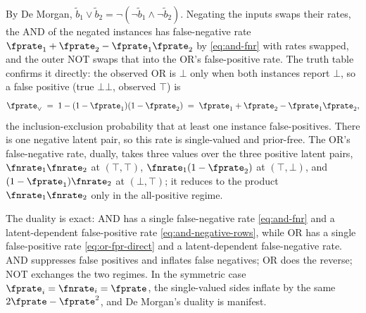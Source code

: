 By De Morgan, $\tilde{b}_1 \vee \tilde{b}_2 =
\neg(\neg \tilde{b}_1 \wedge \neg \tilde{b}_2)$. Negating the inputs swaps
their rates, the AND of the negated instances has false-negative rate $\fprate_1
+ \fprate_2 - \fprate_1 \fprate_2$ by \eqref{eq:and-fnr} with rates swapped, and
the outer NOT swaps that into the OR's false-positive rate. The truth table
confirms it directly: the observed OR is $\bot$ only when both
instances report $\bot$, so a false positive (true $\bot\bot$, observed $\top$)
is
\begin{equation}
\label{eq:or-fpr-direct}
  \fprate_\vee \;=\; 1 - (1 - \fprate_1)(1 - \fprate_2)
               \;=\; \fprate_1 + \fprate_2 - \fprate_1 \fprate_2,
\end{equation}
the inclusion-exclusion probability that at least one instance false-positives.
There is one negative latent pair, so this rate is single-valued and prior-free.
The OR's false-negative rate, dually, takes three values over the three positive
latent pairs, $\fnrate_1 \fnrate_2$ at $(\top, \top)$, $\fnrate_1(1 -
\fprate_2)$ at $(\top, \bot)$, and $(1 - \fprate_1)\fnrate_2$ at $(\bot,
\top)$; it reduces to the product $\fnrate_1 \fnrate_2$ only in the
all-positive regime.

The duality is exact: AND has a single false-negative rate \eqref{eq:and-fnr}
and a latent-dependent false-positive rate \eqref{eq:and-negative-rows}, while
OR has a single false-positive rate \eqref{eq:or-fpr-direct} and a
latent-dependent false-negative rate. AND suppresses false positives and
inflates false negatives; OR does the reverse; NOT exchanges the two regimes.
In the symmetric case $\fprate_i = \fnrate_i = \fprate$, the single-valued
sides inflate by the same $2\fprate - \fprate^2$, and De Morgan's duality is
manifest.

